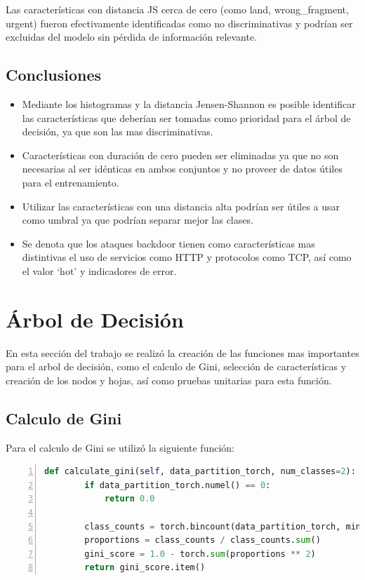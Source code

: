 \documentclass[12pt,a4paper]{article}
\begin{document}
Las características con distancia JS cerca de cero (como land, wrong_fragment, urgent)
fueron efectivamente identificadas como no discriminativas y podrían ser excluidas
del modelo sin pérdida de información relevante.

\subsection{Conclusiones}\label{subsec:conclusiones}

\begin{itemize}
  \item Mediante los histogramas y la distancia Jensen-Shannon es posible identificar las características que deberían ser tomadas como prioridad para el árbol de decisión, ya que son las mas discriminativas.
  \item Características con duración de cero pueden ser eliminadas ya que no son necesarias al ser idénticas en ambos conjuntos y no proveer de datos útiles para el entrenamiento.
  \item Utilizar las características con una distancia alta podrían ser útiles a usar como umbral ya que podrían separar mejor las clases.
  \item Se denota que los ataques backdoor tienen como características mas distintivas el uso de servicios como HTTP y protocolos como TCP, así como el valor `hot' y indicadores de error.
\end{itemize}

\section{Árbol de Decisión}\label{sec:arbol-de-decision}

En esta sección del trabajo se realizó la creación de las funciones mas importantes para el arbol de decisión, como el calculo de Gini,
selección de características y creación de los nodos y hojas, así como pruebas unitarias para esta función.

\subsection{Calculo de Gini}\label{subsec:calculo-de-gini}

Para el calculo de Gini se utilizó la siguiente función:

    \begin{lstlisting}[language=Python, numbers=left,label={lst:lstlisting}, basicstyle=\ttfamily\tiny]
      def calculate_gini(self, data_partition_torch, num_classes=2):
        if data_partition_torch.numel() == 0:
            return 0.0

        class_counts = torch.bincount(data_partition_torch, minlength=num_classes).float()
        proportions = class_counts / class_counts.sum()
        gini_score = 1.0 - torch.sum(proportions ** 2)
        return gini_score.item()
    \end{lstlisting}
\end{document}
